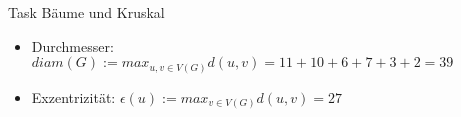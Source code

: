 \begin{frame}[allowframebreaks]{Task \thesection}{Bäume und Kruskal}
\begin{solutionnoinc}
{\begin{minipage}[t]{18cm}
            \end{minipage}
        }
    \end{solutionnoinc}
    \begin{solutionnoinc}
    \end{solutionnoinc}
    \begin{solutionnoinc}
    \end{solutionnoinc}
    \begin{solutionnoinc}
    \end{solutionnoinc}
    \begin{solution}
    \end{solution}
    \begin{solution}
      \begin{itemize}
        \item \alert{Durchmesser:} $diam(G) := max_{u,v\in V(G)} d(u, v) = 11+10+6+7+3+2 = 39$
      \end{itemize}
    \end{solution}
    \begin{solutionnoinc}
      \begin{itemize}
        \item \alert{Exzentrizität:} $\epsilon(u) := max_{v\in V(G)} d(u,v) = 27$
      \end{itemize}
\end{solutionnoinc}
\end{frame}
